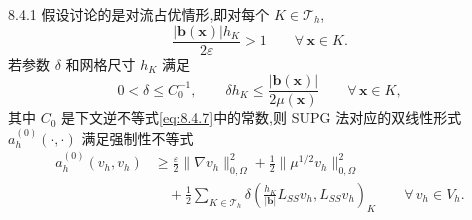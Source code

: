 \begin{proposition}[]{8.4.1}
假设讨论的是对流占优情形,即对每个 \(K\in\mathcal T_h\),
\begin{equation}\label{eq:8.4.3}
  \frac{|\boldsymbol{b}(\boldsymbol{x})|h_K}{2\varepsilon}>1\qquad\forall\,\boldsymbol{x}\in K.
\end{equation}
若参数 \(\delta\) 和网格尺寸 \(h_K\) 满足
\begin{equation}\label{eq:8.4.4}
  0<\delta\le C_0^{-1},\qquad
  \delta h_K\le\frac{|\boldsymbol{b}(\boldsymbol{x})|}{2\mu(\boldsymbol{x})}
             \qquad\forall\,\boldsymbol{x}\in K,
\end{equation}
其中 \(C_0\) 是下文逆不等式\eqref{eq:8.4.7}中的常数,则 SUPG 法对应的双线性形式 \(a_h^{(0)}(\cdot,\cdot)\) 满足强制性不等式
\begin{equation}\label{eq:8.4.5}
  \begin{aligned}
    a_h^{(0)}(v_h,v_h)
      &\ge\frac{\varepsilon}2\|\nabla v_h\|_{0,\Omega}^2
          +\frac12\|\mu^{1/2}v_h\|_{0,\Omega}^2\\
      &\quad+\frac12\sum_{K\in\mathcal T_h}\delta
         \left(\frac{h_K}{|\boldsymbol{b}|}L_{SS}v_h,L_{SS}v_h\right)_K
         \qquad\forall\,v_h\in V_h.
  \end{aligned}
\end{equation}
\end{proposition}

